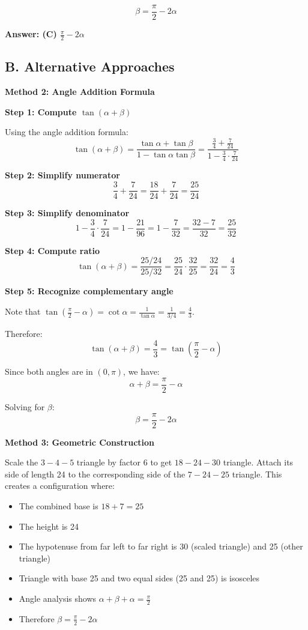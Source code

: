 \documentclass[11pt]{article}
\begin{document}
\begin{solutionbox}
\[
\beta = \frac{\pi}{2} - 2\alpha
\]

\textbf{Answer: (C) $\frac{\pi}{2} - 2\alpha$}

\subsection*{B. Alternative Approaches}

\textbf{Method 2: Angle Addition Formula}

\textbf{Step 1: Compute $\tan(\alpha + \beta)$}

Using the angle addition formula:
\[
\tan(\alpha + \beta) = \frac{\tan\alpha + \tan\beta}{1 - \tan\alpha\tan\beta} = \frac{\frac{3}{4} + \frac{7}{24}}{1 - \frac{3}{4} \cdot \frac{7}{24}}
\]

\textbf{Step 2: Simplify numerator}
\[
\frac{3}{4} + \frac{7}{24} = \frac{18}{24} + \frac{7}{24} = \frac{25}{24}
\]

\textbf{Step 3: Simplify denominator}
\[
1 - \frac{3}{4} \cdot \frac{7}{24} = 1 - \frac{21}{96} = 1 - \frac{7}{32} = \frac{32 - 7}{32} = \frac{25}{32}
\]

\textbf{Step 4: Compute ratio}
\[
\tan(\alpha + \beta) = \frac{25/24}{25/32} = \frac{25}{24} \cdot \frac{32}{25} = \frac{32}{24} = \frac{4}{3}
\]

\textbf{Step 5: Recognize complementary angle}

Note that $\tan\left(\frac{\pi}{2} - \alpha\right) = \cot\alpha = \frac{1}{\tan\alpha} = \frac{1}{3/4} = \frac{4}{3}$.

Therefore:
\[
\tan(\alpha + \beta) = \frac{4}{3} = \tan\left(\frac{\pi}{2} - \alpha\right)
\]

Since both angles are in $(0, \pi)$, we have:
\[
\alpha + \beta = \frac{\pi}{2} - \alpha
\]

Solving for $\beta$:
\[
\beta = \frac{\pi}{2} - 2\alpha
\]

\textbf{Method 3: Geometric Construction}

Scale the $3{-}4{-}5$ triangle by factor 6 to get $18{-}24{-}30$ triangle. Attach its side of length 24 to the corresponding side of the $7{-}24{-}25$ triangle. This creates a configuration where:
\begin{itemize}
    \item The combined base is $18 + 7 = 25$
    \item The height is 24
    \item The hypotenuse from far left to far right is 30 (scaled triangle) and 25 (other triangle)
    \item Triangle with base 25 and two equal sides (25 and 25) is isosceles
    \item Angle analysis shows $\alpha + \beta + \alpha = \frac{\pi}{2}$
    \item Therefore $\beta = \frac{\pi}{2} - 2\alpha$
\end{itemize}


\end{solutionbox}
\end{document}
